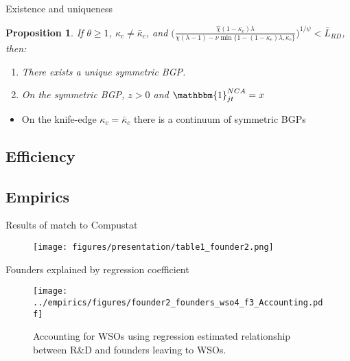 \documentclass[english,usenames,dvipsnames]{beamer}
\newtheorem{proposition}{Proposition}
\begin{document}
\begin{frame}{Existence and uniqueness}\label{existence_and_uniqueness}\hyperlink{characterizing_BGP}{} 
	\begin{proposition}\label{proposition:purstrategyeq:positiveOI}
		If $\theta \ge 1$, $\kappa_c \ne \bar{\kappa}_c$, and $\Big( \frac{\hat{\chi} (1-\kappa_{e}) \lambda}{\chi(\lambda-1) - \nu \min\{ 1-(1-\kappa_e) \lambda, \kappa_c \}} \Big)^{1/\psi} < \bar{L}_{RD}$, then:
		\begin{enumerate}
			\item There exists a unique symmetric BGP.
			\item On the symmetric BGP, $z > 0$ and $\mathbbm{1}^{NCA}_{jt} = x$
		\end{enumerate}
	\end{proposition}
	\begin{itemize}
		\item On the knife-edge $\kappa_c = \bar{\kappa}_c$ there is a continuum of symmetric BGPs
	\end{itemize}
\end{frame}

\subsection{Efficiency}

\subsection{Empirics}


\begin{frame}{Results of match to Compustat}\label{results_of_match}
	\hyperlink{economic_magnitude}{}
	\begin{figure}
		\texttt{[image: figures/presentation/table1\_founder2.png]}
	\end{figure}
\end{frame}

\begin{frame}{Founders explained by regression coefficient}\label{regs_economic_significance}
	\hyperlink{economic_magnitude}{}
	\begin{figure}[!htb]
		\texttt{[image: ../empirics/figures/founder2\_founders\_wso4\_f3\_Accounting.pdf]}
		\caption{\small Accounting for WSOs using regression estimated relationship between R\&D and founders leaving to WSOs.}
	\end{figure}
\end{frame}
\end{document}
